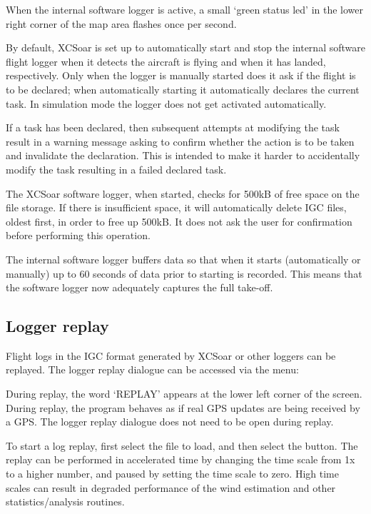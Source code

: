 When the internal software logger is active, a small `green status led' in the
lower right corner of the map area flashes once per second.

By default, XCSoar is set up to automatically start and stop the
internal software flight logger when it detects the aircraft is flying
and when it has landed, respectively.  Only when the logger is
manually started does it ask if the flight is to be declared; when
automatically starting it automatically declares the current task.
In simulation mode the logger does not get activated automatically.

If a task has been declared, then subsequent attempts at modifying the
task result in a warning message asking to confirm whether the action
is to be taken and invalidate the declaration.  This is intended to
make it harder to accidentally modify the task resulting in a failed
declared task.

The XCSoar software logger, when started, checks for 500kB of free
space on the file storage.  If there is insufficient space, it will
automatically delete IGC files, oldest first, in order to free up
500kB.  It does not ask the user for confirmation before performing
this operation. \warning

The internal software logger buffers data so that when it starts
(automatically or manually) up to 60 seconds of data prior to starting
is recorded.  This means that the software logger now adequately
captures the full take-off.

\subsection*{Logger replay}\label{sec:logger-replay}
Flight logs in the IGC format generated by XCSoar or other loggers can
be replayed.  The logger replay dialogue can be accessed via the
menu:
\begin{quote}
\blink{}
\end{quote}

During replay, the word `REPLAY' appears at the lower left corner of
the screen.  During replay, the program behaves as if real GPS updates
are being received by a GPS.  The logger replay dialogue does not need
to be open during replay.

To start a log replay, first select the file to load, and then select the
 button.  The replay can be performed in accelerated time
by changing the time scale from 1x to a higher number, and paused by
setting the time scale to zero.  High time scales can result in degraded
performance of the wind estimation and other statistics/analysis routines.

